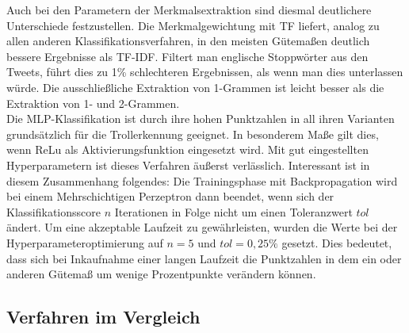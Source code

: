 Auch bei den Parametern der Merkmalsextraktion sind diesmal deutlichere Unterschiede festzustellen. Die Merkmalgewichtung mit TF liefert, analog zu allen anderen Klassifikationsverfahren, in den meisten Gütemaßen deutlich bessere Ergebnisse als TF-IDF. Filtert man englische Stoppwörter aus den Tweets, führt dies zu 1\% schlechteren Ergebnissen, als wenn man dies unterlassen würde. Die ausschließliche Extraktion von 1-Grammen ist leicht besser als die Extraktion von 1- und 2-Grammen.\\
Die MLP-Klassifikation ist durch ihre hohen Punktzahlen in all ihren Varianten grundsätzlich für die Trollerkennung geeignet. In besonderem Maße gilt dies, wenn ReLu als Aktivierungsfunktion eingesetzt wird. Mit gut eingestellten Hyperparametern ist dieses Verfahren äußerst verlässlich. Interessant ist in diesem Zusammenhang folgendes: Die Trainingsphase mit Backpropagation wird bei einem Mehrschichtigen Perzeptron dann beendet, wenn sich der Klassifikationsscore $n$ Iterationen in Folge nicht um einen Toleranzwert $tol$ ändert. Um eine akzeptable Laufzeit zu gewährleisten, wurden die Werte bei der Hyperparameteroptimierung auf $n = 5$ und $tol = 0,25\%$ gesetzt. Dies bedeutet, dass sich bei Inkaufnahme einer langen Laufzeit die Punktzahlen in dem ein oder anderen Gütemaß um wenige Prozentpunkte verändern können.
\pagebreak
\subsection{Verfahren im Vergleich}